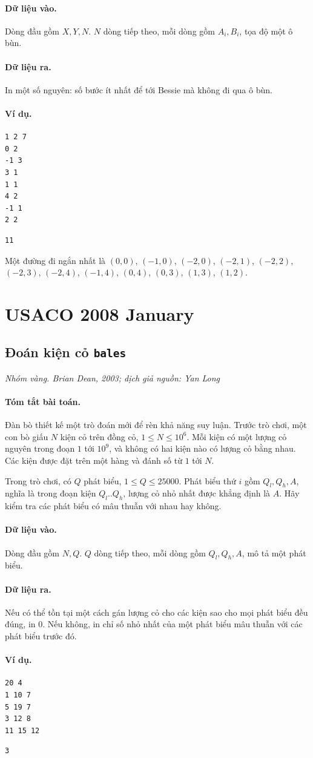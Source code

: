 \documentclass[11pt]{article}
\newcommand{\problem}[4]{%
  \subsection[#1 (#2)]{#1 \hfill {\normalsize\texttt{#2}}}%
  \noindent\textit{#3. #4}\par\smallskip
}
\newcommand{\iosec}[1]{\paragraph{#1}}
\begin{document}
\iosec{Dữ liệu vào.}
Dòng đầu gồm \(X,Y,N\). \(N\) dòng tiếp theo, mỗi dòng gồm \(A_i,B_i\), tọa
độ một ô bùn.

\iosec{Dữ liệu ra.}
In một số nguyên: số bước ít nhất để tới Bessie mà không đi qua ô bùn.

\iosec{Ví dụ.}
\begin{verbatim}
1 2 7
0 2
-1 3
3 1
1 1
4 2
-1 1
2 2
\end{verbatim}

\begin{verbatim}
11
\end{verbatim}

Một đường đi ngắn nhất là \((0,0)\), \((-1,0)\), \((-2,0)\), \((-2,1)\),
\((-2,2)\), \((-2,3)\), \((-2,4)\), \((-1,4)\), \((0,4)\), \((0,3)\),
\((1,3)\), \((1,2)\).

\section{USACO 2008 January}

\problem{Đoán kiện cỏ}{bales}{Nhóm vàng}{Brian Dean, 2003; dịch giả nguồn: Yan Long}

\iosec{Tóm tắt bài toán.}
Đàn bò thiết kế một trò đoán mới để rèn khả năng suy luận. Trước trò chơi,
một con bò giấu \(N\) kiện cỏ trên đồng cỏ, \(1\le N\le 10^6\). Mỗi kiện có
một lượng cỏ nguyên trong đoạn \(1\) tới \(10^9\), và không có hai kiện nào
có lượng cỏ bằng nhau. Các kiện được đặt trên một hàng và đánh số từ \(1\)
tới \(N\).

Trong trò chơi, có \(Q\) phát biểu, \(1\le Q\le 25000\). Phát biểu thứ \(i\)
gồm \(Q_l,Q_h,A\), nghĩa là trong đoạn kiện \(Q_l..Q_h\), lượng cỏ nhỏ nhất
được khẳng định là \(A\). Hãy kiểm tra các phát biểu có mâu thuẫn với nhau
hay không.

\iosec{Dữ liệu vào.}
Dòng đầu gồm \(N,Q\). \(Q\) dòng tiếp theo, mỗi dòng gồm \(Q_l,Q_h,A\), mô tả
một phát biểu.

\iosec{Dữ liệu ra.}
Nếu có thể tồn tại một cách gán lượng cỏ cho các kiện sao cho mọi phát biểu
đều đúng, in \(0\). Nếu không, in chỉ số nhỏ nhất của một phát biểu mâu thuẫn
với các phát biểu trước đó.

\iosec{Ví dụ.}
\begin{verbatim}
20 4
1 10 7
5 19 7
3 12 8
11 15 12
\end{verbatim}

\begin{verbatim}
3
\end{verbatim}
\end{document}
